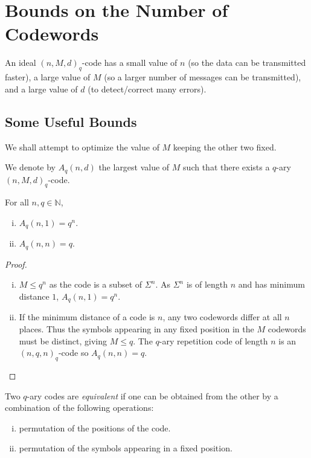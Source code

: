 \section{Bounds on the Number of Codewords}

An ideal $(n,M,d)_q$-code has a small value of $n$ (so the data can be transmitted faster), a large value of $M$ (so a larger number of messages can be transmitted), and a large value of $d$ (to detect/correct many errors).

\subsection{Some Useful Bounds}

We shall attempt to optimize the value of $M$ keeping the other two fixed.

\begin{definition}
We denote by $A_q(n,d)$ the largest value of $M$ such that there exists a $q$-ary $(n,M,d)_q$-code.
\end{definition}

\begin{theorem}
For all $n,q\in\mathbb{N}$,
\begin{enumerate}[(i)]
    \item $A_q(n,1)=q^n$.
    \item $A_q(n,n)=q$.
\end{enumerate}
\end{theorem}
\begin{proof}
\phantom{owo}
\begin{enumerate}[(i)]
    \item $M\leq q^n$ as the code is a subset of $\Sigma^n$. As $\Sigma^n$ is of length $n$ and has minimum distance $1$, $A_q(n,1)=q^n$.
    \item If the minimum distance of a code is $n$, any two codewords differ at all $n$ places. Thus the symbols appearing in any fixed position in the $M$ codewords must be distinct, giving $M\leq q$. The $q$-ary repetition code of length $n$ is an $(n,q,n)_q$-code so $A_q(n,n)=q$.
\end{enumerate}
\end{proof}

\begin{definition}
\label{equivalent1}
    Two $q$-ary codes are \textit{equivalent} if one can be obtained from the other by a combination of the following operations:
    \begin{enumerate}[(i)]
        \item permutation of the positions of the code.
        \item permutation of the symbols appearing in a fixed position.
    \end{enumerate}
\end{definition}

